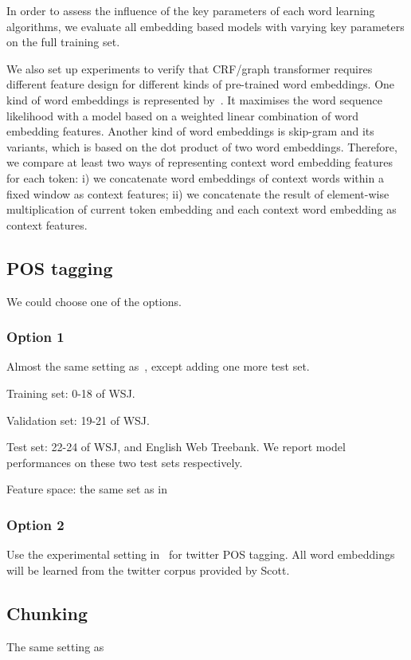 \documentclass[11pt]{article}
\begin{document}
In order to assess the influence of the key parameters of each word learning algorithms, we evaluate all embedding based models with varying key parameters on the full training set.

We also set up experiments to verify that CRF/graph transformer requires different feature design for different kinds of pre-trained word embeddings. One kind of word embeddings is represented by~\cite{bengio2006neural}. It maximises the word sequence likelihood with a model based on a weighted linear combination of word embedding features. Another kind of word embeddings is skip-gram and its variants, which is based on the dot product of two word embeddings. Therefore, we compare at least two ways of representing context word embedding features for each token: i) we concatenate word embeddings of context words within a fixed window as context features; ii) we concatenate the result of element-wise multiplication of current token embedding and each context word embedding as context features. 

\subsection{POS tagging}
We could choose one of the options.
\subsubsection{Option 1}
Almost the same setting as~\cite{collobert2011natural}, except adding one more test set.

\noindent
Training set: 0-18 of WSJ.

\noindent
Validation set: 19-21 of WSJ.

\noindent
Test set: 22-24 of WSJ, and English Web Treebank. We report model performances on these two test sets respectively.

\noindent
Feature space: the same set as in~\cite{collobert2011natural}

\subsubsection{Option 2}

Use the experimental setting in~\cite{owoputi2013improved} for twitter POS tagging. All word embeddings will be learned from the twitter corpus provided by Scott.

\subsection{Chunking} 
The same setting as~\cite{turian2010word}\\
\end{document}
